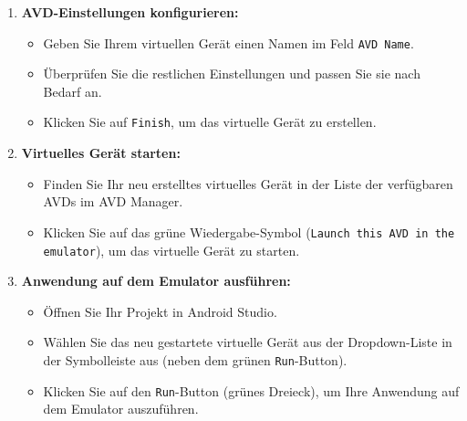 \documentclass[conference,a4paper,flushend]{cs-techrep}
\begin{document}
\begin{enumerate}
\begin{itemize}
    \end{itemize}
    \vspace{0.5em}
    \item \textbf{AVD-Einstellungen konfigurieren:}
    \vspace{0.5em}
    \begin{itemize}
        \item Geben Sie Ihrem virtuellen Gerät einen Namen im Feld \texttt{AVD Name}.
        \vspace{0.5em}
        \item Überprüfen Sie die restlichen Einstellungen und passen Sie sie nach Bedarf an.
        \vspace{0.5em}
        \item Klicken Sie auf \texttt{Finish}, um das virtuelle Gerät zu erstellen.
        \vspace{0.5em}
    \end{itemize}
    \vspace{0.5em}
    \item \textbf{Virtuelles Gerät starten:}
    \vspace{0.5em}
    \begin{itemize}
        \item Finden Sie Ihr neu erstelltes virtuelles Gerät in der Liste der verfügbaren AVDs im AVD Manager.
        \vspace{0.5em}
        \item Klicken Sie auf das grüne Wiedergabe-Symbol (\texttt{Launch this AVD in the emulator}), um das virtuelle Gerät zu starten.
        \vspace{0.5em}
    \end{itemize}
    \vspace{0.5em}
    \item \textbf{Anwendung auf dem Emulator ausführen:}
    \vspace{0.5em}
    \begin{itemize}
        \item Öffnen Sie Ihr Projekt in Android Studio.
        \vspace{0.5em}
        \item Wählen Sie das neu gestartete virtuelle Gerät aus der Dropdown-Liste in der Symbolleiste aus (neben dem grünen \texttt{Run}-Button).
        \vspace{0.5em}
        \item Klicken Sie auf den \texttt{Run}-Button (grünes Dreieck), um Ihre Anwendung auf dem Emulator auszuführen.
        \vspace{0.5em}
    \end{itemize}
\end{enumerate}
\end{document}
